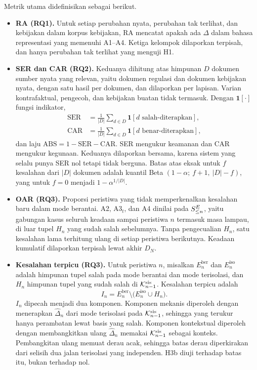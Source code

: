 Metrik utama didefinisikan sebagai berikut.
\begin{itemize}[leftmargin=*,nosep]
  \item \textbf{RA (RQ1).} Untuk setiap perubahan nyata, perubahan tak terlihat, dan kebijakan dalam korpus kebijakan, RA mencatat apakah ada $\Delta$ dalam bahasa representasi yang memenuhi A1--A4. Ketiga kelompok dilaporkan terpisah, dan hanya perubahan tak terlihat yang menguji H1.
  \item \textbf{SER dan CAR (RQ2).} Keduanya dihitung atas himpunan $D$ dokumen sumber nyata yang relevan, yaitu dokumen regulasi dan dokumen kebijakan nyata, dengan satu hasil per dokumen, dan dilaporkan per lapisan. Varian kontrafaktual, pengecoh, dan kebijakan buatan tidak termasuk. Dengan $\mathbf{1}[\cdot]$ fungsi indikator,
  \begin{align}
  \mathrm{SER} &= \tfrac{1}{|D|}\textstyle\sum_{d \in D} \mathbf{1}[d \text{ salah-diterapkan}], \label{eq:ser}\\
  \mathrm{CAR} &= \tfrac{1}{|D|}\textstyle\sum_{d \in D} \mathbf{1}[d \text{ benar-diterapkan}], \nonumber
  \end{align}
  dan laju  $\mathrm{ABS} = 1 - \mathrm{SER} - \mathrm{CAR}$. SER mengukur keamanan dan CAR mengukur kegunaan. Keduanya dilaporkan bersama, karena sistem yang selalu  punya SER nol tetapi tidak berguna. Batas atas eksak untuk $f$ kesalahan dari $|D|$ dokumen adalah kuantil Beta $(1-\alpha;\ f+1,\ |D|-f)$, yang untuk $f=0$ menjadi $1-\alpha^{1/|D|}$.
  \item \textbf{OAR (RQ3).} Proporsi peristiwa yang tidak memperkenalkan kesalahan baru dalam mode berantai. A2, A3$_t$, dan A4 dinilai pada $S^{E}_{\leq n}$, yaitu gabungan kasus seluruh keadaan sampai peristiwa $n$ termasuk masa lampau, di luar tupel $H_n$ yang sudah salah sebelumnya. Tanpa pengecualian $H_n$, satu kesalahan lama terhitung ulang di setiap peristiwa berikutnya. Keadaan kumulatif dilaporkan terpisah lewat  akhir $D_N$.
  \item \textbf{Kesalahan terpicu (RQ3).} Untuk peristiwa $n$, misalkan $E^{\mathrm{ber}}_n$ dan $E^{\mathrm{iso}}_n$ adalah himpunan tupel salah pada mode berantai dan mode terisolasi, dan $H_n$ himpunan tupel yang sudah salah di $\mathcal{K}^{\mathrm{sis}}_{n-1}$. Kesalahan terpicu adalah
  \begin{equation}
  I_n = E^{\mathrm{ber}}_n \setminus \big(E^{\mathrm{iso}}_n \cup H_n\big).
  \label{eq:terpicu}
  \end{equation}
  $I_n$ dipecah menjadi dua komponen. Komponen mekanis diperoleh dengan menerapkan $\hat{\Delta}_n$ dari mode terisolasi pada $\mathcal{K}^{\mathrm{sis}}_{n-1}$, sehingga yang terukur hanya perambatan lewat basis yang salah. Komponen kontekstual diperoleh dengan membangkitkan ulang $\hat{\Delta}_n$ memakai $\mathcal{K}^{\mathrm{sis}}_{n-1}$ sebagai konteks. Pembangkitan ulang memuat derau acak, sehingga batas derau diperkirakan dari selisih dua jalan terisolasi yang independen. H3b diuji terhadap batas itu, bukan terhadap nol.

\end{itemize}
